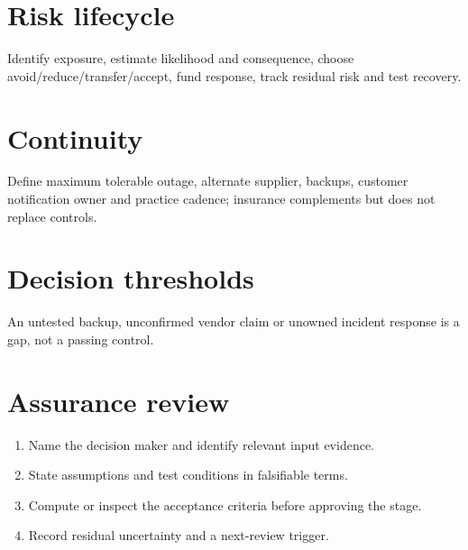 \documentclass[11pt]{article}
\begin{document}
\section{Risk lifecycle}
Identify exposure, estimate likelihood and consequence, choose avoid/reduce/transfer/accept, fund response, track residual risk and test recovery.
\section{Continuity}
Define maximum tolerable outage, alternate supplier, backups, customer notification owner and practice cadence; insurance complements but does not replace controls.
\section{Decision thresholds}
An untested backup, unconfirmed vendor claim or unowned incident response is a gap, not a passing control.
\section{Assurance review}
\begin{enumerate}[leftmargin=*,itemsep=5pt]
\item Name the decision maker and identify relevant input evidence.
\item State assumptions and test conditions in falsifiable terms.
\item Compute or inspect the acceptance criteria before approving the stage.
\item Record residual uncertainty and a next-review trigger.
\end{enumerate}
\end{document}
